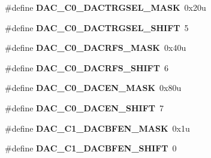 \begin{DoxyCompactItemize}
\item 
\hypertarget{group___d_a_c___register___masks_gac6dd81bc6500fc4b972c62bde339f31d}{}\#define {\bfseries D\+A\+C\+\_\+\+C0\+\_\+\+D\+A\+C\+T\+R\+G\+S\+E\+L\+\_\+\+M\+A\+S\+K}~0x20u\label{group___d_a_c___register___masks_gac6dd81bc6500fc4b972c62bde339f31d}

\item 
\hypertarget{group___d_a_c___register___masks_ga32f43711fa193364231213bd67c989f4}{}\#define {\bfseries D\+A\+C\+\_\+\+C0\+\_\+\+D\+A\+C\+T\+R\+G\+S\+E\+L\+\_\+\+S\+H\+I\+F\+T}~5\label{group___d_a_c___register___masks_ga32f43711fa193364231213bd67c989f4}

\item 
\hypertarget{group___d_a_c___register___masks_gadc1973eafb50599b83de95422477a1f5}{}\#define {\bfseries D\+A\+C\+\_\+\+C0\+\_\+\+D\+A\+C\+R\+F\+S\+\_\+\+M\+A\+S\+K}~0x40u\label{group___d_a_c___register___masks_gadc1973eafb50599b83de95422477a1f5}

\item 
\hypertarget{group___d_a_c___register___masks_ga495d0702c9899844340d198120a77e33}{}\#define {\bfseries D\+A\+C\+\_\+\+C0\+\_\+\+D\+A\+C\+R\+F\+S\+\_\+\+S\+H\+I\+F\+T}~6\label{group___d_a_c___register___masks_ga495d0702c9899844340d198120a77e33}

\item 
\hypertarget{group___d_a_c___register___masks_ga6865b52ae9a9275ef4db48eb3eb5d62a}{}\#define {\bfseries D\+A\+C\+\_\+\+C0\+\_\+\+D\+A\+C\+E\+N\+\_\+\+M\+A\+S\+K}~0x80u\label{group___d_a_c___register___masks_ga6865b52ae9a9275ef4db48eb3eb5d62a}

\item 
\hypertarget{group___d_a_c___register___masks_gae8835f0083d5a4e588402a32047e95cb}{}\#define {\bfseries D\+A\+C\+\_\+\+C0\+\_\+\+D\+A\+C\+E\+N\+\_\+\+S\+H\+I\+F\+T}~7\label{group___d_a_c___register___masks_gae8835f0083d5a4e588402a32047e95cb}

\item 
\hypertarget{group___d_a_c___register___masks_ga61aa82d21d0c84ff4fe42d0856c506bd}{}\#define {\bfseries D\+A\+C\+\_\+\+C1\+\_\+\+D\+A\+C\+B\+F\+E\+N\+\_\+\+M\+A\+S\+K}~0x1u\label{group___d_a_c___register___masks_ga61aa82d21d0c84ff4fe42d0856c506bd}

\item 
\hypertarget{group___d_a_c___register___masks_ga2062351429a9e737c0ac434488b59fe4}{}\#define {\bfseries D\+A\+C\+\_\+\+C1\+\_\+\+D\+A\+C\+B\+F\+E\+N\+\_\+\+S\+H\+I\+F\+T}~0\label{group___d_a_c___register___masks_ga2062351429a9e737c0ac434488b59fe4}


\end{DoxyCompactItemize}

